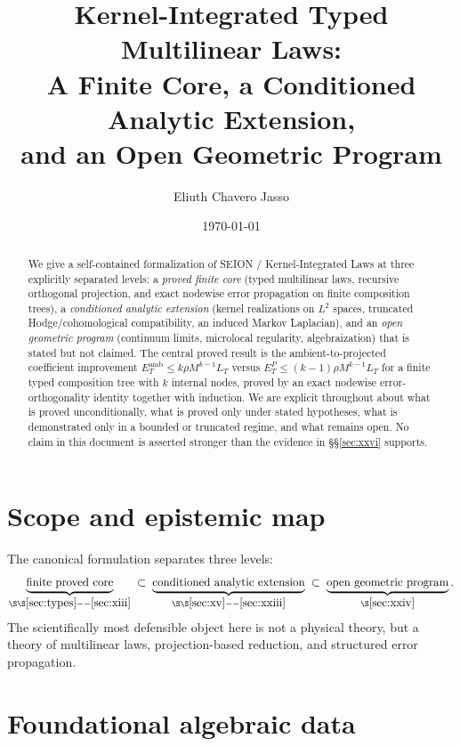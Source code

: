 \documentclass[11pt]{amsart}
\title{Kernel-Integrated Typed Multilinear Laws:\\
A Finite Core, a Conditioned Analytic Extension,\\
and an Open Geometric Program}
\author{Eliuth Chavero Jasso}
\date{\today}
\theoremstyle{definition}
\theoremstyle{remark}
\begin{document}
\maketitle
{}

\begin{abstract}
We give a self-contained formalization of SEION / Kernel-Integrated Laws
at three explicitly separated levels: a \emph{proved finite core}
(typed multilinear laws, recursive orthogonal projection, and exact
nodewise error propagation on finite composition trees), a
\emph{conditioned analytic extension} (kernel realizations on
$L^2$ spaces, truncated Hodge/cohomological compatibility, an induced
Markov Laplacian), and an \emph{open geometric program} (continuum
limits, microlocal regularity, algebraization) that is stated but not
claimed. The central proved result is the ambient-to-projected
coefficient improvement
$E_T^{\mathrm{amb}} \le k\rho M^{k-1}L_T$ versus
$E_T^{P} \le (k-1)\rho M^{k-1}L_T$
for a finite typed composition tree with $k$ internal nodes, proved by
an exact nodewise error-orthogonality identity together with induction.
We are explicit throughout about what is proved unconditionally, what
is proved only under stated hypotheses, what is demonstrated only in a
bounded or truncated regime, and what remains open. No claim in this
document is asserted stronger than the evidence in
\S\S\ref{sec:xxvi} supports.
\end{abstract}

\tableofcontents

\section{Scope and epistemic map}

The canonical formulation separates three levels:
\[
\underbrace{\text{finite proved core}}_{\S\S\ref{sec:types}--\ref{sec:xiii}}
\;\subset\;
\underbrace{\text{conditioned analytic extension}}_{\S\S\ref{sec:xv}--\ref{sec:xxiii}}
\;\subset\;
\underbrace{\text{open geometric program}}_{\S\ref{sec:xxiv}}.
\]
The scientifically most defensible object here is not a physical
theory, but a theory of multilinear laws, projection-based reduction,
and structured error propagation.

\section{Foundational algebraic data}
\label{sec:types}
\end{document}
